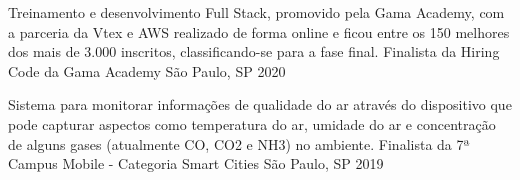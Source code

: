 
\begin{cventries}
  \cventry
    {Treinamento e desenvolvimento Full Stack, promovido pela Gama Academy, com a parceria da Vtex e AWS realizado de forma online e ficou entre os 150 melhores dos mais de 3.000 inscritos, classificando-se
    para a fase final.}
    {Finalista da Hiring Code da Gama Academy}
    {São Paulo, SP}
    {2020}
    {}

  \cventry
    {Sistema para monitorar informações de qualidade do ar através do dispositivo que pode capturar aspectos como temperatura do ar, umidade do ar e concentração de alguns gases (atualmente CO, CO2 e NH3) no ambiente.}
    {Finalista da 7ª Campus Mobile - Categoria Smart Cities}
    {São Paulo, SP}
    {2019}
    {}
\end{cventries}
